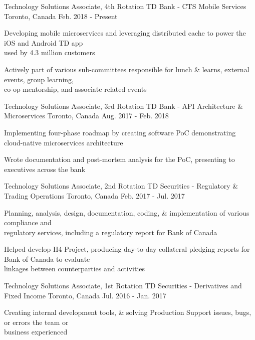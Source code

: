 \begin{cventries}
   \cventry
     {Technology Solutions Associate, 4th Rotation}
     {TD Bank - CTS Mobile Services}
     {Toronto, Canada}
     {Feb. 2018 - Present}
     {
      \begin{cvitems}
       \item {Developing mobile microservices and leveraging distributed cache to power the iOS and Android TD app \\used by
       4.3 million customers}
       \item {Actively part of various sub-committees responsible for lunch \& learns, external events, group learning, \\ co-op mentorship, and associate related events}
      \end{cvitems}
      }
	\cventry
     {Technology Solutions Associate, 3rd Rotation}
     {TD Bank - API Architecture \& Microservices}
     {Toronto, Canada}
     {Aug. 2017 - Feb. 2018}
     {
      \begin{cvitems}
       \item {Implementing four-phase roadmap by creating software PoC demonstrating cloud-native microservices architecture}
       \item {Wrote documentation and post-mortem analysis for the PoC, presenting to executives across the bank}
      \end{cvitems}
      }
   \cventry
    {Technology Solutions Associate, 2nd Rotation}
    {TD Securities - Regulatory \& Trading Operations}
    {Toronto, Canada}
    {Feb. 2017 - Jul. 2017}
    {
      \begin{cvitems}
        \item {Planning, analysis, design, documentation, coding, \& implementation of various compliance and \\regulatory services, including a regulatory report for Bank of Canada}
        \item {Helped develop H4 Project, producing day-to-day collateral pledging reports for Bank of Canada to evaluate \\linkages between counterparties and activities}
      \end{cvitems}
    }
  \cventry
    {Technology Solutions Associate, 1st Rotation}
    {TD Securities - Derivatives and Fixed Income}
    {Toronto, Canada}
    {Jul. 2016 - Jan. 2017}
    {
      \begin{cvitems}
        \item {Creating internal development tools, \& solving Production Support issues, bugs, or errors the team or \\business experienced}

\end{cvitems}}
\end{cventries}
